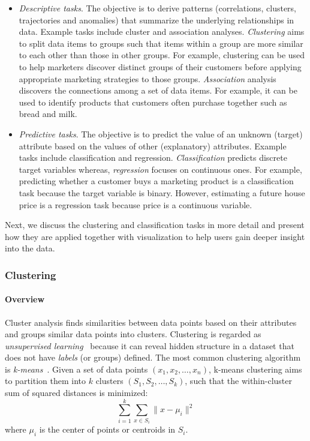 \begin{itemize}
		\item \emph{Descriptive tasks}. The objective is to derive patterns (correlations, clusters, trajectories and anomalies) that summarize the underlying relationships in data. Example tasks include cluster and association analyses. \emph{Clustering} aims to split data items to groups such that items within a group are more similar to each other than those in other groups. For example, clustering can be used to help marketers discover distinct groups of their customers before applying appropriate marketing strategies to those groups. \emph{Association} analysis discovers the connections among a set of data items. For example, it can be used to identify products that customers often purchase together such as bread and milk.

		\item \emph{Predictive tasks}. The objective is to predict the value of an unknown (target) attribute based on the values of other (explanatory) attributes. Example tasks include classification and regression. \emph{Classification} predicts discrete target variables whereas, \emph{regression} focuses on continuous ones. For example, predicting whether a customer buys a marketing product is a classification task because the target variable is binary. However, estimating a future house price is a regression task because price is a continuous variable.
\end{itemize}

Next, we discuss the clustering and classification tasks in more detail and present how they are applied together with visualization to help users gain deeper insight into the data.

\subsubsection{Clustering}

\paragraph{Overview}
Cluster analysis finds similarities between data points based on their attributes and groups similar data points into clusters. Clustering is regarded as \emph{unsupervised learning}~\cite{Han2011} because it can reveal hidden structure in a dataset that does not have \emph{labels} (or groups) defined. The most common clustering algorithm is \emph{k-means}~\cite{Lloyd1982}. Given a set of data points $(x_1, x_2, \dots, x_n)$, k-means clustering aims to partition them into $k$ clusters $(S_1, S_2, \dots, S_k)$, such that the within-cluster sum of squared distances is minimized:
\[
\sum_{i=1}^k\sum_{x\in S_i} \lVert x-\mu_i \rVert^2
\]
where $\mu_i$ is the center of points or centroids in $S_i$.

